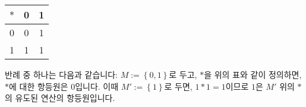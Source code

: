 \documentclass[12pt]{paper}
\begin{document}
  \begin{table}[ht]
    \centering
    \label{t1}
    \begin{tabular}{|c|c|c|}
    \noalign{\smallskip}\noalign{\smallskip}\hline
    $*$ & 0 & 1 \\
    \hline
    0 & 0 & 1 \\
    \hline
    1 & 1 & 1 \\
    \hline
    \end{tabular}
  \end{table}
  반례 중 하나는 다음과 같습니다:
  $M := \left\{ 0 , 1 \right\}$로 두고,
  $*$을 위의 표와 같이 정의하면, 
  $*$에 대한 항등원은 $0$입니다.
  이때 $M' := \left\{ 1 \right\}$로 두면,
  $1 * 1 = 1$이므로 $1$은 $M'$ 위의 $*$의 유도된 연산의 항등원입니다.

  

  
\end{document}
